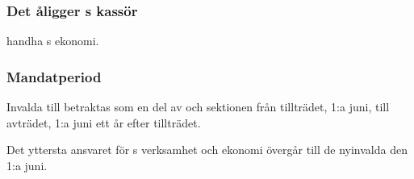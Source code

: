 \subsubsection{Det åligger \FANBARERIT{}s kassör}
\begin{att}
	\item handha \FANBARERIT{}s ekonomi.
\end{att}

\subsubsection{Mandatperiod}
Invalda till \FANBARERIT{} betraktas som en del av \FANBARERIT{} och sektionen från tillträdet, 1:a juni, till avträdet, 1:a juni ett år efter tillträdet.

Det yttersta ansvaret för \FANBARERIT{}s verksamhet och ekonomi övergår till de nyinvalda den 1:a juni.
